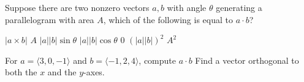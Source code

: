 \documentclass[addpoints]{exam}
\begin{document}
\begin{questions}
\question[10] Suppose there are two nonzero vectors $a,b$ with angle $\theta$ generating a parallelogram with area $A$, which of the following is equal to $a \cdot b$? 

\begin{oneparchoices}
\choice $|a \times b|$
\choice $A$
\choice $|a||b| \sin \theta$
\CorrectChoice $|a||b| \cos \theta$ 
\choice $0$
\choice $(|a||b|)^2$
\choice $A^2$
\end{oneparchoices} 
\vspace{0.5cm}
\question[25] For $a = \langle 3,0,-1 \rangle$ and $b = \langle -1, 2, 4 \rangle$, compute $a \cdot b$
\vspace{0.5cm}
\question[25] Find a vector orthogonal to both the $x$ and the $y$-axes.


\end{questions}
\end{document}
